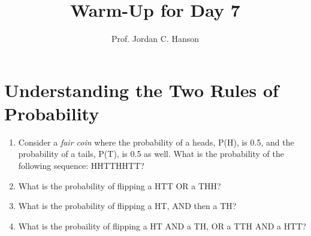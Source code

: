 \documentclass{article}
\begin{document}
\title{Warm-Up for Day 7}
\author{Prof. Jordan C. Hanson}

\maketitle

\section{Understanding the Two Rules of Probability}

\begin{enumerate}
\item Consider a \textit{fair coin} where the probability of a heads, P(H), is 0.5, and the probability of a tails, P(T), is 0.5 as well.  What is the probability of the following sequence: HHTTHHTT? \\ \vspace{2cm}
\item What is the probability of flipping a HTT OR a THH? \\ \vspace{2cm}
\item What is the probability of flipping a HT, AND then a TH? \\ \vspace{2cm}
\item What is the probaility of flipping a HT AND a TH, OR a TTH AND a HTT?
\end{enumerate}
\end{document}
